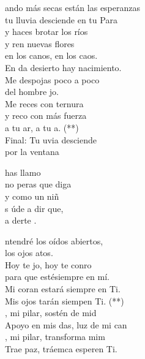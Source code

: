 \documentclass[12pt]{article}
\begin{document}
\begin{multicols*}{2}
\begin{cancion}%
	ando más secas están las esperanzas\\
	tu lluvia desciende en tu Para\\
	y haces brotar los ríos\\
	y ren nuevas flores\\
	en los canos, en los caos.\\
	En da desierto hay nacimiento.\\
Me despojas poco a poco \\
	del hombre jo.\\
	Me reces con ternura\\
	y reco con más fuerza\\
	a tu ar, a tu a. (**)\\
	Final: Tu uvia desciende \\
       por la ventana\\
\end{cancion}%

\begin{cancion}%
	  has llamo\\
	no peras que diga\\
	y como un niñ\\
	s úde a dir que, \\
	a derte .\\
\end{cancion}%

\begin{cancion}%
	ntendré los oídos abiertos,\\
	los ojos atos.\\
	Hoy te jo, hoy te conro\\
	para que estésiempre en mí.\\
	Mi coran estará siempre en Ti.\\
	Mis ojos tarán siempen Ti. (**)\\
	, mi pilar, sostén de mid\\
	Apoyo en mis das, luz de mi can\\
	, mi pilar, transforma mim\\
	Trae paz, tráemca esperen Ti.\\
\end{cancion}%


\end{multicols*}
\end{document}
